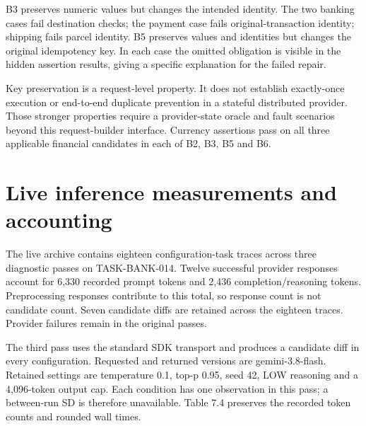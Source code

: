 \documentclass[12pt,a4paper,oneside]{report}
\begin{document}
B3 preserves numeric values but changes the intended identity. The two banking cases fail destination checks; the payment case fails original-transaction identity; shipping fails parcel identity. B5 preserves values and identities but changes the original idempotency key. In each case the omitted obligation is visible in the hidden assertion results, giving a specific explanation for the failed repair.

Key preservation is a request-level property. It does not establish exactly-once execution or end-to-end duplicate prevention in a stateful distributed provider. Those stronger properties require a provider-state oracle and fault scenarios beyond this request-builder interface. Currency assertions pass on all three applicable financial candidates in each of B2, B3, B5 and B6.

\section{Live inference measurements and accounting}

The live archive contains eighteen configuration-task traces across three diagnostic passes on TASK-BANK-014. Twelve successful provider responses account for 6,330 recorded prompt tokens and 2,436 completion/reasoning tokens. Preprocessing responses contribute to this total, so response count is not candidate count. Seven candidate diffs are retained across the eighteen traces. Provider failures remain in the original passes.

The third pass uses the standard SDK transport and produces a candidate diff in every configuration. Requested and returned versions are gemini-3.8-flash. Retained settings are temperature 0.1, top-p 0.95, seed 42, LOW reasoning and a 4,096-token output cap. Each condition has one observation in this pass; a between-run SD is therefore unavailable. Table 7.4 preserves the recorded token counts and rounded wall times.
\end{document}
